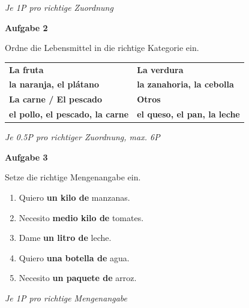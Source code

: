 \documentclass[11pt, a4paper]{article}
\newcommand{\fachfarbe}{spanisch}
\newcommand{\punktebox}[1]{\hfill\fbox{\small \_/#1}}
\newcommand{\loesung}[1]{\textcolor{loesung}{\textbf{#1}}}
\newenvironment{aufgabe}[1]{%
    \vspace{10pt}
    \noindent\textbf{\textcolor{\fachfarbe}{Aufgabe #1}}
    \vspace{5pt}
    \begin{list}{}{\leftmargin=0pt}
    \item[]
}{%
    \end{list}
}
\begin{document}
\textit{\textcolor{grau}{Je 1P pro richtige Zuordnung}}

\vspace{15pt}


\begin{aufgabe}{2}
Ordne die Lebensmittel in die richtige Kategorie ein. \punktebox{6}
\end{aufgabe}

\begin{tabularx}{\textwidth}{|X|X|}
\hline
\textbf{La fruta} & \textbf{La verdura} \\
\loesung{la naranja, el plátano} & \loesung{la zanahoria, la cebolla} \\[1em]
\hline
\textbf{La carne / El pescado} & \textbf{Otros} \\
\loesung{el pollo, el pescado, la carne} & \loesung{el queso, el pan, la leche} \\[1em]
\hline
\end{tabularx}

\vspace{0.5em}
\textit{\textcolor{grau}{Je 0.5P pro richtiger Zuordnung, max. 6P}}

\vspace{15pt}


\begin{aufgabe}{3}
Setze die richtige Mengenangabe ein. \punktebox{5}
\end{aufgabe}

\begin{enumerate}[label=\alph*)]
    \item Quiero \loesung{un kilo de} manzanas.
    \item Necesito \loesung{medio kilo de} tomates.
    \item Dame \loesung{un litro de} leche.
    \item Quiero \loesung{una botella de} agua.
    \item Necesito \loesung{un paquete de} arroz.
\end{enumerate}

\textit{\textcolor{grau}{Je 1P pro richtige Mengenangabe}}
\end{document}
